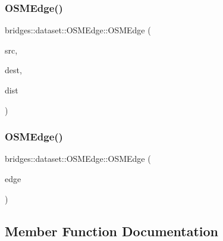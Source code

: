 \subsubsection{\texorpdfstring{O\+S\+M\+Edge()}{OSMEdge()}\hspace{0.1cm}{\footnotesize\ttfamily [1/2]}}
{\footnotesize\ttfamily bridges\+::dataset\+::\+O\+S\+M\+Edge\+::\+O\+S\+M\+Edge (\begin{DoxyParamCaption}\item[{\hyperlink{classbridges_1_1dataset_1_1_o_s_m_vertex_ad166f13b0aefbdc05a273546f2a3bb96}{O\+S\+M\+Vertex\+::\+O\+S\+M\+Vertex\+ID}}]{src,  }\item[{\hyperlink{classbridges_1_1dataset_1_1_o_s_m_vertex_ad166f13b0aefbdc05a273546f2a3bb96}{O\+S\+M\+Vertex\+::\+O\+S\+M\+Vertex\+ID}}]{dest,  }\item[{double}]{dist }\end{DoxyParamCaption})\hspace{0.3cm}{\ttfamily [inline]}}

\mbox{\label{classbridges_1_1dataset_1_1_o_s_m_edge_a8e412f87ed35e5667987de457e5609b6}} 
\subsubsection{\texorpdfstring{O\+S\+M\+Edge()}{OSMEdge()}\hspace{0.1cm}{\footnotesize\ttfamily [2/2]}}
{\footnotesize\ttfamily bridges\+::dataset\+::\+O\+S\+M\+Edge\+::\+O\+S\+M\+Edge (\begin{DoxyParamCaption}\item[{const \hyperlink{classbridges_1_1dataset_1_1_o_s_m_edge}{O\+S\+M\+Edge} $\ast$}]{edge }\end{DoxyParamCaption})\hspace{0.3cm}{\ttfamily [inline]}}



\subsection{Member Function Documentation}
\mbox{\label{classbridges_1_1dataset_1_1_o_s_m_edge_ae9b23f06502688abd4ebc7b03abef7bc}} 
